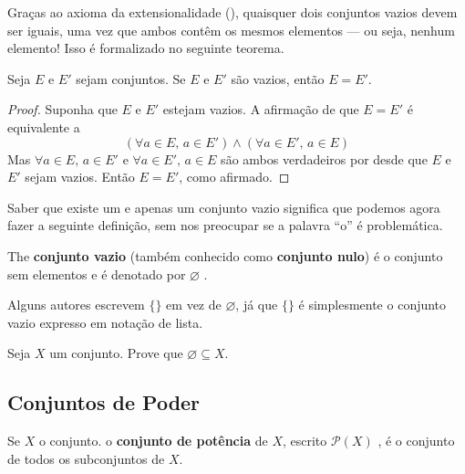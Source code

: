 Graças ao axioma da extensionalidade (), quaisquer dois conjuntos vazios devem ser iguais, uma vez que ambos contêm os mesmos elementos --- ou seja, nenhum elemento! Isso é formalizado no seguinte teorema.

\begin{theorem}
\label{thmEmptySetIsUnique}
Seja $E$ e $E'$ sejam conjuntos. Se $E$ e $E'$ são vazios, então $E=E'$.
\end{theorem}
\begin{proof}
Suponha que $E$ e $E'$ estejam vazios. A afirmação de que $E=E'$ é equivalente a
\[ (\forall a \in E,\, a \in E') \wedge (\forall a \in E',\, a \in E) \]
Mas $\forall a \in E,\, a \in E'$ e $\forall a \in E',\, a \in E$ são ambos verdadeiros por  desde que $E$ e $E'$ sejam vazios. Então $E=E'$, como afirmado.
\end{proof}

Saber que existe um e apenas um conjunto vazio significa que podemos agora fazer a seguinte definição, sem nos preocupar se a palavra “o” é problemática.

\begin{definition}
\label{defEmptySet}
The \textbf{conjunto vazio} (também conhecido como \textbf{conjunto nulo}) é o conjunto sem elementos e é denotado por $\varnothing$ .
\end{definition}

Alguns autores escrevem $\{ \}$ em vez de $\varnothing$, já que $\{ \}$ é simplesmente o conjunto vazio expresso em notação de lista.

\begin{exercise}
\label{exEmptySetSubsetOfEverySet}
Seja $X$ um conjunto. Prove que $\varnothing \subseteq X$.
\end{exercise}

\subsection*{Conjuntos de Poder}

\begin{definition}
\label{defPowerSet}
Se $X$ o conjunto. o \textbf{conjunto de potência} de $X$, escrito $\mathcal{P}(X)$ , é o conjunto de todos os subconjuntos de $X$.
\end{definition}


